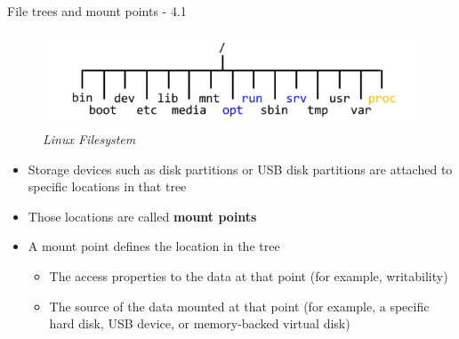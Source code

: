 \documentclass[ignorenonframetext,]{beamer}
\providecommand{\tightlist}{%
  \setlength{\itemsep}{0pt}\setlength{\parskip}{0pt}}
\begin{document}
\begin{frame}{File trees and mount points - 4.1}
\protect\hypertarget{file-trees-and-mount-points---4.1}{}

\begin{figure}
\centering
\includegraphics{./tex2pdf.-d218b5bed17bed47/4bca1da672e7a55d4ea76c418b0dd551142883e3.png}
\caption{\emph{Linux Filesystem}}
\end{figure}

\begin{itemize}
\tightlist
\item
  Storage devices such as disk partitions or USB disk partitions are
  attached to specific locations in that tree
\item
  Those locations are called \textbf{mount points}
\item
  A mount point defines the location in the tree

  \begin{itemize}
  \tightlist
  \item
    The access properties to the data at that point (for example,
    writability)
  \item
    The source of the data mounted at that point (for example, a
    specific hard disk, USB device, or memory-backed virtual disk)
  \end{itemize}
\end{itemize}

\end{frame}
\end{document}
